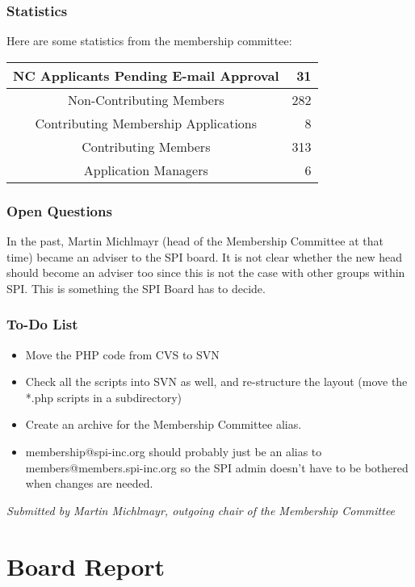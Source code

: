 \documentclass[letterpaper]{report}
\begin{document}
\subsection{Statistics}

Here are some statistics from the membership committee:

\begin{tabular}{|c|r|}

\hline
NC Applicants Pending E-mail Approval & 31 \tabularnewline
\hline
Non-Contributing Members & 282 \tabularnewline
\hline
Contributing Membership Applications & 8 \tabularnewline
\hline
Contributing Members & 313 \tabularnewline
\hline
Application Managers & 6 \tabularnewline
\hline

\end{tabular}


\subsection{Open Questions}

In the past, Martin Michlmayr (head of the Membership Committee at that
time) became an adviser to the SPI board. It is not clear whether the new
head should become an adviser too since this is not the case with other
groups within SPI.  This is something the SPI Board has to decide.

\subsection{To-Do List}

\begin{itemize}
\item Move the PHP code from CVS to SVN
\item Check all the scripts into SVN as well, and re-structure the layout (move the *.php scripts in a subdirectory)
\item Create an archive for the Membership Committee alias.
\item membership@spi-inc.org should probably just be an alias to members@members.spi-inc.org so the SPI admin doesn't have to be bothered when changes are needed.
\end{itemize}

\emph{Submitted by Martin Michlmayr, outgoing chair of the Membership Committee}


\chapter{Board Report}
\end{document}
